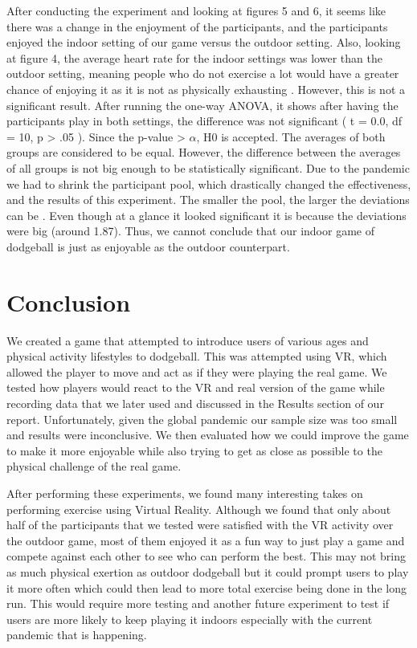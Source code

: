 \documentclass{sigchi}
\begin{document}
After conducting the experiment and looking at figures 5 and 6, it seems like there was a change in the enjoyment of the participants, and the participants enjoyed the indoor setting of our game versus the outdoor setting. Also, looking at figure 4, the average heart rate for the indoor settings was lower than the outdoor setting, meaning people who do not exercise a lot would have a greater chance of enjoying it as it is not as physically exhausting \cite{teixeira_2012}.  However, this is not a significant result. After running the one-way ANOVA, it shows after having the participants play in both settings, the difference was not significant ( t = 0.0, df = 10, p > .05 ). Since the p-value > $\alpha$,  H0 is accepted. The averages of both groups are considered to be equal. However, the difference between the averages of all groups is not big enough to be statistically significant. Due to the pandemic we had to shrink the participant pool, which drastically changed the effectiveness, and the results of this experiment. The smaller the pool, the larger the deviations can be \cite{simmons_2019}. Even though at a glance it looked significant it is because the deviations were big (around 1.87). Thus, we cannot conclude that our indoor game of dodgeball is just as enjoyable as the outdoor counterpart. 

\section{Conclusion}
We created a game that attempted to introduce users of various ages and physical activity lifestyles to dodgeball. This was attempted using VR, which allowed the player to move and act as if they were playing the real game. We tested how players would react to the VR and real version of the game while recording data that we later used and discussed in the Results section of our report. Unfortunately, given the global pandemic our sample size was too small and results were inconclusive. We then evaluated how we could improve the game to make it more enjoyable while also trying to get as close as possible to the physical challenge of the real game.

After performing these experiments, we found many interesting takes on performing exercise using Virtual Reality. Although we found that only about half of the participants that we tested were satisfied with the VR activity over the outdoor game, most of them enjoyed it as a fun way to just play a game and compete against each other to see who can perform the best. This may not bring as much physical exertion as outdoor dodgeball but it could prompt users to play it more often which could then lead to more total exercise being done in the long run. This would require more testing and another future experiment to test if users are more likely to keep playing it indoors especially with the current pandemic that is happening. 
\end{document}
